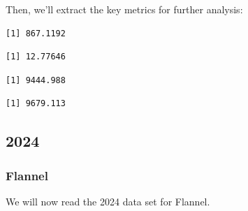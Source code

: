 Then, we'll extract the key metrics for further analysis:

\begin{Shaded}
\begin{Highlighting}[]
\SpecialCharTok{\$}
\end{Highlighting}
\end{Shaded}

\begin{verbatim}
[1] 867.1192
\end{verbatim}

\begin{Shaded}
\begin{Highlighting}[]
\SpecialCharTok{\$}
\end{Highlighting}
\end{Shaded}

\begin{verbatim}
[1] 12.77646
\end{verbatim}

\begin{Shaded}
\begin{Highlighting}[]
\SpecialCharTok{\$}
\end{Highlighting}
\end{Shaded}

\begin{verbatim}
[1] 9444.988
\end{verbatim}

\begin{Shaded}
\begin{Highlighting}[]
\SpecialCharTok{\$}
\end{Highlighting}
\end{Shaded}

\begin{verbatim}
[1] 9679.113
\end{verbatim}

\subsection{2024}

\subsubsection{Flannel}

We will now read the 2024 data set for Flannel.

